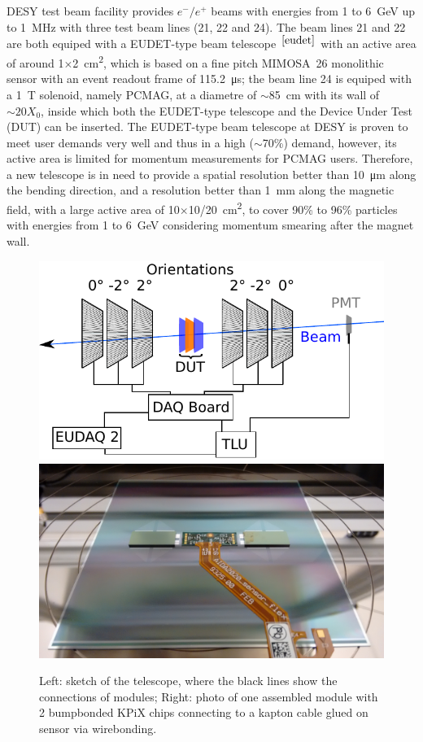 DESY test beam facility provides $e^-/e^+$ beams with energies from 1 to \SI{6}{\GeV} up to \SI{1}{\MHz}
with three test beam lines (21, 22 and 24).
The beam lines 21 and 22 are both equiped with a EUDET-type beam telescope~$^{\cite{eudet}}$ with an active area of around 1$\times$\SI{2}{\square\centi\metre},
which is based on a fine pitch \uppercase{mimosa}~26 monolithic sensor with an event readout frame of \SI{115.2}{\micro\second};
the beam line 24 is equiped with a \SI{1}{\tesla} solenoid, namely PCMAG, at a diametre of $\sim$\SI{85}{\centi\metre} with its wall of $\sim20X_0$,
inside which both the EUDET-type telescope and the Device Under Test (DUT) can be inserted.
The EUDET-type beam telescope at DESY is proven to meet user demands very well and thus in a high ($\sim$70\%) demand,
however, its active area is limited for momentum measurements for PCMAG users.
Therefore, a new telescope is in need to provide a spatial resolution better than \SI{10}{\micro\metre} along the bending direction, and a resolution better than \SI{1}{\milli\metre} along the magnetic field,
with a large active area of 10$\times$10/\SI{20}{\square\centi\metre},
to cover 90\% to 96\% particles with energies from 1 to \SI{6}{\GeV} considering momentum smearing after the magnet wall.

\begin{figure}[!ht]%
\centering
\includegraphics[width=0.49\linewidth]{pics/principle.pdf}
\includegraphics[width=0.49\linewidth]{pics/sensor_module1.jpg}
\caption{Left: sketch of the \lycoris telescope, where the black lines show the connections of modules;
Right: photo of one assembled module with 2 bumpbonded KPiX chips connecting to a kapton cable glued on sensor via wirebonding.}%
\label{fig:1figs}%
\end{figure}


